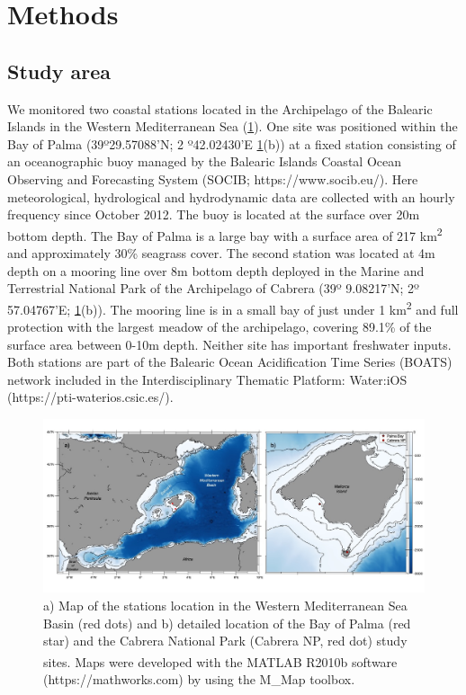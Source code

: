 \section{Methods}
\subsection*{Study area}
We monitored two coastal stations located in the Archipelago of the
Balearic Islands in the Western Mediterranean Sea (\cref{fig:1}). One site was
positioned within the Bay of Palma (39º29.57088’N; 2 º42.02430’E
\cref{fig:1}(b)) at a fixed station consisting of an oceanographic buoy managed
by the Balearic Islands Coastal Ocean Observing and Forecasting System (SOCIB;
https://www.socib.eu/). Here meteorological, hydrological and hydrodynamic data
are collected with an hourly frequency since October 2012. The buoy is located
at the surface over 20m bottom depth. The Bay of Palma is a large bay with a
surface area of 217 km\textsuperscript{2} and approximately 30\% seagrass
cover\cite{gazeau2005whole}. The second station was located at 4m depth on a
mooring line over 8m bottom depth deployed in the Marine and Terrestrial
National Park of the Archipelago of Cabrera (39º 9.08217’N; 2º 57.04767’E;
\cref{fig:1}(b)). The mooring line is in a small bay of just under 1
km\textsuperscript{2} and full protection with the largest meadow of the
archipelago, covering 89.1\% of the surface area between 0-10m
depth\cite{marba2002effectiveness}. Neither site has important freshwater
inputs. Both stations are part of the Balearic Ocean Acidification Time Series
(BOATS) network included in the Interdisciplinary Thematic Platform: Water:iOS
(https://pti-waterios.csic.es/).

\begin{figure}[H]
    \centering
    \includegraphics[width=\textwidth]{Figures/Fig_1.jpg}
    \caption[Map of the stations location in the Western Mediterranean Sea
        Basin]{a) Map of the stations location in the Western Mediterranean Sea
        Basin (red dots) and b) detailed location of the Bay of Palma (red
        star) and
        the Cabrera National Park (Cabrera NP, red dot) study sites. Maps were
        developed with the MATLAB\textsuperscript{\textregistered} R2010b
        software
        (https://mathworks.com) by using the M\_Map
        toolbox\cite{pawlowicz2020m_map}.}
    \label{fig:1}
\end{figure}

